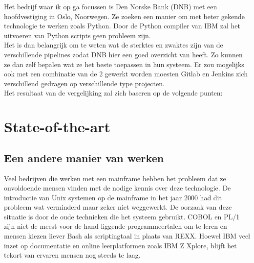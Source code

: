Het bedrijf waar ik op ga focussen is Den Norske Bank (DNB) met een hoofdvestiging in Oslo, Noorwegen. Ze zoeken een manier om met beter gekende technologie te werken zoals Python. Door de Python compiler van IBM zal het uitvoeren van Python scripts geen probleem zijn. \\
Het is dan belangrijk om te weten wat de sterktes en zwaktes zijn van de verschillende pipelines zodat DNB hier een goed overzicht van heeft. Zo kunnen ze dan zelf bepalen wat ze het beste toepassen in hun systeem. Er zou mogelijks ook met een combinatie van de 2 gewerkt worden moesten Gitlab en Jenkins zich verschillend gedragen op verschillende type projecten. \\

Het resultaat van de vergelijking zal zich baseren op de volgende punten:
%


\section{State-of-the-art}%
\label{sec:state-of-the-art}

\subsection{Een andere manier van werken}
Veel bedrijven die werken met een mainframe hebben het probleem dat ze onvoldoende mensen vinden met de nodige kennis over deze technologie. De introductie van Unix systemen op de mainframe in het jaar 2000 \autocite{Mertic2020} had dit probleem wat verminderd maar zeker niet weggewerkt. De oorzaak van deze situatie is door de oude technieken die het systeem gebruikt. COBOL en PL/1 zijn niet de meest voor de hand liggende programmeertalen om te leren en mensen kiezen liever Bash als scriptingtaal in plaats van REXX. Hoewel IBM veel inzet op documentatie en online leerplatformen zoals IBM Z Xplore, blijft het tekort van ervaren mensen nog steeds te laag. \\


